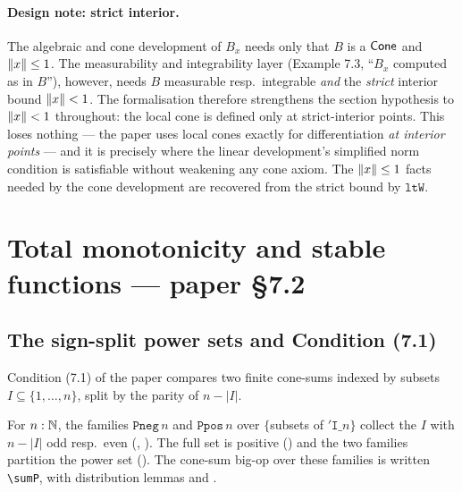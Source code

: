 \paragraph{Design note: strict interior.}
The algebraic and cone development of $B_x$ needs only that $B$ is a
$\mathsf{Cone}$ and $\lVert x \rVert \leq 1$. The measurability and integrability
layer (Example 7.3, ``$B_x$ computed as in $B$''), however, needs $B$
measurable resp.\ integrable \emph{and} the \emph{strict} interior bound
$\lVert x \rVert < 1$. The formalisation therefore strengthens the section
hypothesis to $\lVert x \rVert < 1$ throughout: the local cone is defined only
at strict-interior points. This loses nothing --- the paper uses local
cones exactly for differentiation \emph{at interior points} --- and it
is precisely where the linear development's simplified norm condition
is satisfiable without weakening any cone axiom. The
$\lVert x \rVert \leq 1$ facts needed by the cone development are recovered
from the strict bound by $\texttt{ltW}$.

\section{Total monotonicity and stable functions --- paper \S7.2}%
\label{sec:totmono}

\subsection{The sign-split power sets and Condition (7.1)}

Condition (7.1) of the paper compares two finite cone-sums indexed by
subsets $I \subseteq \{1,\dots,n\}$, split by the parity of $n - |I|$.

\begin{definition}\label{def:sign-split}
\rocqok
{}\rocqok
For $n : \mathbb{N}$, the families $\texttt{Pneg}\,n$ and $\texttt{Ppos}\,n$
over $\{$subsets of $\mathtt{'I}\_n\}$ collect the $I$ with $n - |I|$
odd resp.\ even (,
). The full set is positive
() and the two families partition
the power set (). The cone-sum
big-op over these families is written \texttt{\textbackslash sumP}, with distribution lemmas
 and
.
\end{definition}

